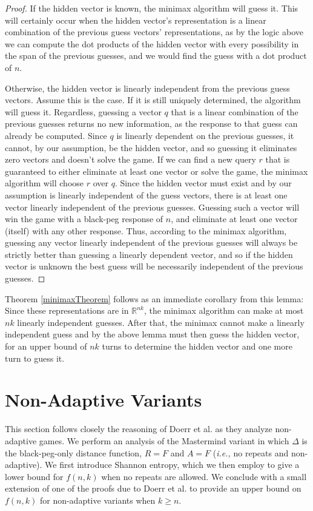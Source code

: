 \documentclass[12pt, a4paper]{article}
\newcommand{\R}{\mathbb{R}}           %
\begin{document}
\begin{proof}
	If the hidden vector is known, the minimax algorithm will guess it. This will certainly occur when the hidden vector's representation is a linear combination of the previous guess vectors' representations, as by the logic above we can compute the dot products of the hidden vector with every possibility in the span of the previous guesses, and we would find the guess with a dot product of $n$.
	
	Otherwise, the hidden vector is linearly independent from the previous guess vectors. Assume this is the case. If it is still uniquely determined, the algorithm will guess it. Regardless, guessing a vector $q$ that is a linear combination of the previous guesses returns no new information, as the response to that guess can already be computed. Since $q$ is linearly dependent on the previous guesses, it cannot, by our assumption, be the hidden vector, and so guessing it eliminates zero vectors and doesn't solve the game. If we can find a new query $r$ that is guaranteed to either eliminate at least one vector or solve the game, the minimax algorithm will choose $r$ over $q$. Since the hidden vector must exist and by our assumption is linearly independent of the guess vectors, there is at least one vector linearly independent of the previous guesses. Guessing such a vector will win the game with a black-peg response of $n$, and eliminate at least one vector (itself) with any other response. Thus, according to the minimax algorithm, guessing any vector linearly independent of the previous guesses will always be strictly better than guessing a linearly dependent vector, and so if the hidden vector is unknown the best guess will be necessarily independent of the previous guesses.
\end{proof}
Theorem \ref{minimaxTheorem} follows as an immediate corollary from this lemma: Since these representations are in $\R^{nk}$, the minimax algorithm can make at most $nk$ linearly independent guesses. After that, the minimax cannot make a linearly independent guess and by the above lemma must then guess the hidden vector, for an upper bound of $nk$ turns to determine the hidden vector and one more turn to guess it.

\section{Non-Adaptive Variants}
This section follows closely the reasoning of Doerr et al. \cite{DS13} as they analyze non-adaptive games.  We perform an analysis of the Mastermind variant in which $\Delta$ is the black-peg-only distance function, $R=F$ and $A=F$ (\textit{i.e.,} no repeats and non-adaptive). We first introduce Shannon entropy, which we then employ to give a lower bound for $f(n,k)$ when no repeats are allowed. We conclude with a small extension of one of the proofs due to Doerr et al. to provide an upper bound on $f(n,k)$ for non-adaptive variants when $k\ge n$.
\end{document}

